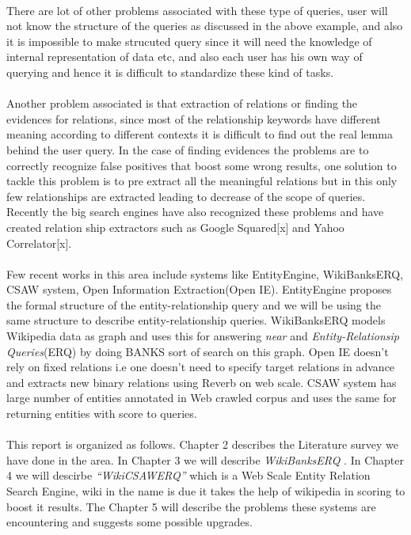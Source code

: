 \documentclass[a4paper,12pt]{report}
\begin{document}
\paragraph*{}
There are lot of other problems associated with these type of queries, user will not know the structure of the queries as discussed in the above example, and also it is impossible to make strucuted query since it will need the knowledge of internal representation of data etc, and also each user has his own way of querying and hence it is difficult to standardize these kind of tasks.\\
\paragraph*{}
Another problem associated is that extraction of relations or finding the evidences for relations, since most of the relationship keywords have different meaning according to different contexts it is difficult to find out the real lemma behind the user query. In the case of finding evidences the problems are to correctly recognize false positives that boost some wrong results, one solution to tackle this problem is to pre extract all the meaningful relations but in this only few relationships are extracted leading to decrease of the scope of queries. Recently the big search engines have also recognized these problems and have created relation ship extractors such as Google Squared[x] and Yahoo Correlator[x].

\paragraph*{}
Few recent works in this area include systems like EntityEngine, WikiBanksERQ, CSAW system, Open Information Extraction(Open IE). EntityEngine proposes the 
formal structure of the entity-relationship query and we will be using the same structure to describe entity-relationship queries. WikiBanksERQ models Wikipedia 
data as graph and uses this for answering \textit{near} and \textit{Entity-Relationsip Queries}(ERQ) by doing BANKS sort of search on this graph. Open IE doesn't rely on fixed relations i.e one doesn't need
to specify target relations in advance and extracts new binary relations using Reverb on web scale. CSAW system has large number of entities annotated in Web crawled corpus and uses the same for
returning entities with score to queries.

\paragraph*{}
This report is organized as follows. Chapter 2 describes the Literature survey we have done in the area. In Chapter 3 we will describe \textit{WikiBanksERQ} . In Chapter 4 we will descirbe \textit{``WikiCSAWERQ''} which is a Web Scale Entity Relation Search Engine, wiki in the name is due it takes the help of wikipedia in scoring to boost it results. The Chapter 5 will describe the problems these systems are encountering and suggests some possible upgrades. 
\end{document}
